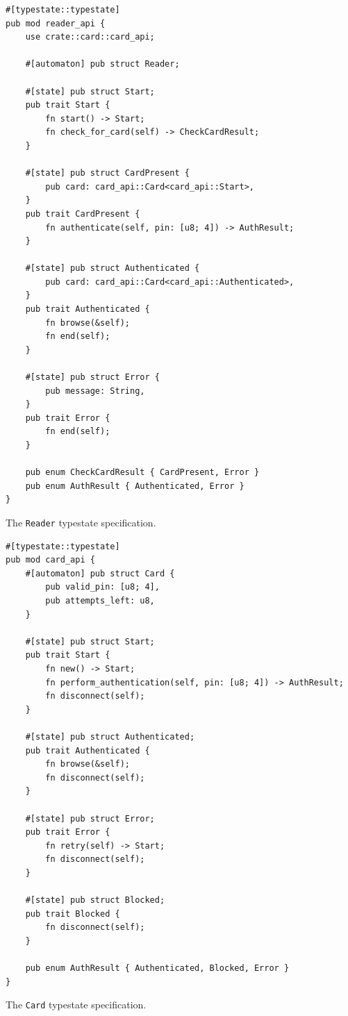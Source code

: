 \begin{listing}
    \begin{verbatim}
#[typestate::typestate]
pub mod reader_api {
    use crate::card::card_api;

    #[automaton] pub struct Reader;

    #[state] pub struct Start;
    pub trait Start {
        fn start() -> Start;
        fn check_for_card(self) -> CheckCardResult;
    }

    #[state] pub struct CardPresent {
        pub card: card_api::Card<card_api::Start>,
    }
    pub trait CardPresent {
        fn authenticate(self, pin: [u8; 4]) -> AuthResult;
    }

    #[state] pub struct Authenticated {
        pub card: card_api::Card<card_api::Authenticated>,
    }
    pub trait Authenticated {
        fn browse(&self);
        fn end(self);
    }

    #[state] pub struct Error {
        pub message: String,
    }
    pub trait Error {
        fn end(self);
    }

    pub enum CheckCardResult { CardPresent, Error }
    pub enum AuthResult { Authenticated, Error }
}
    \end{verbatim}
    \caption{The \texttt{Reader} typestate specification.}
    \label{lst:typestate-reader}
\end{listing}

\begin{listing}
    \begin{verbatim}
#[typestate::typestate]
pub mod card_api {
    #[automaton] pub struct Card {
        pub valid_pin: [u8; 4],
        pub attempts_left: u8,
    }

    #[state] pub struct Start;
    pub trait Start {
        fn new() -> Start;
        fn perform_authentication(self, pin: [u8; 4]) -> AuthResult;
        fn disconnect(self);
    }

    #[state] pub struct Authenticated;
    pub trait Authenticated {
        fn browse(&self);
        fn disconnect(self);
    }

    #[state] pub struct Error;
    pub trait Error {
        fn retry(self) -> Start;
        fn disconnect(self);
    }

    #[state] pub struct Blocked;
    pub trait Blocked {
        fn disconnect(self);
    }

    pub enum AuthResult { Authenticated, Blocked, Error }
}
    \end{verbatim}
    \caption{The \texttt{Card} typestate specification.}
    \label{lst:typestate-card}
\end{listing}


